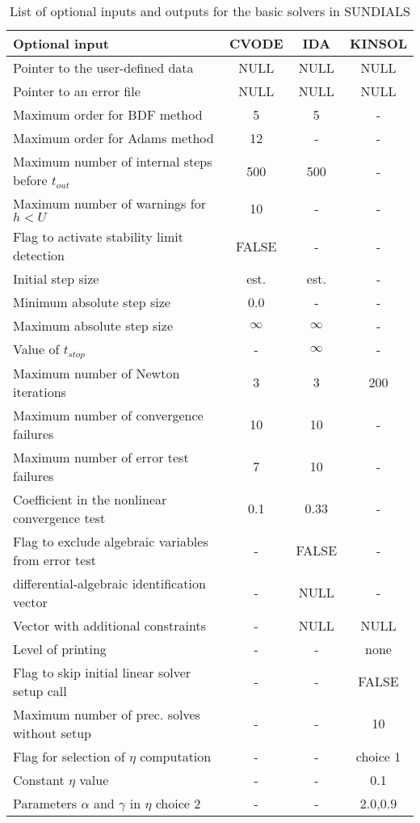 \begin{table}[tp]
\label{t:optional_io}
\centering
\caption{List of optional inputs and outputs for the basic solvers in SUNDIALS}
\medskip
\begin{tabular}{|p{2.75in}|c|c|c|}
\hline
{\bf Optional input} & CVODE  & IDA & KINSOL \\
\hline
Pointer to the user-defined data & NULL & NULL& NULL \\
Pointer to an error file & NULL & NULL & NULL \\
Maximum order for BDF method & 5 & 5 & - \\
Maximum order for Adams method& 12  & - & - \\
Maximum number of internal steps before $t_{out}$ & 500 & 500 & - \\
Maximum number of warnings for $h < U$ & 10 & - & - \\
Flag to activate stability limit detection & FALSE & - & - \\
Initial step size & est. & est. & - \\
Minimum absolute step size & 0.0 & - & - \\
Maximum absolute step size & $\infty$ & $\infty$ & - \\
Value of $t_{stop}$ & - & $\infty$ & - \\
Maximum number of Newton iterations & 3 & 3 & 200 \\
Maximum number of convergence failures & 10 & 10 & - \\
Maximum number of error test failures & 7 & 10 & - \\
Coefficient in the nonlinear convergence test & 0.1 & 0.33 & - \\
Flag to exclude algebraic variables from error test & - & FALSE & - \\
differential-algebraic identification vector & - & NULL & - \\
Vector with additional constraints & - & NULL & NULL \\
Level of printing & - & - & none \\
Flag to skip initial linear solver setup call & - & - & FALSE \\
Maximum number of prec. solves without setup & - & - & 10 \\
Flag for selection of $\eta$ computation & - & - & choice 1 \\
Constant $\eta$ value & - & - & 0.1 \\
Parameters $\alpha$ and $\gamma$ in $\eta$ choice 2 & - & - & $2.0$,$0.9$\\

\end{tabular}
\end{table}
